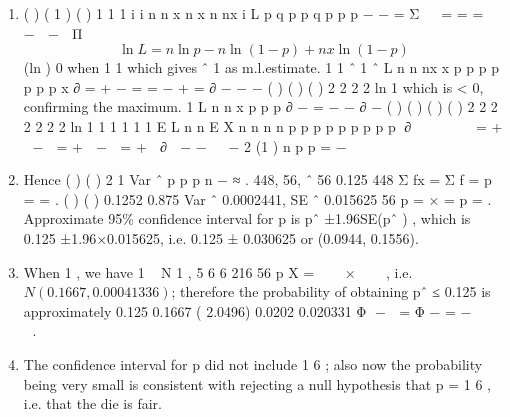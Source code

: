 \documentclass[a4paper,12pt]{article}
\begin{document}
\begin{enumerate}
\item ( ) ( 1 ) ( )
1
1
1
i i
n n
x n x n nx
i
L p q p p q p p
p
− −
=
Σ   = = =   −  −  Π
\[ \ln L = n \ln p − n\ln (1− p) + nx \ln(1− p)\]
(ln ) 0 when 1 1 which gives ˆ 1 as m.l.estimate.
1 1 ˆ 1 ˆ
L n n nx x p
p p p p p p x
∂ = + − = = − + =
∂ − − −
( ) ( )
( )
2
2 2 2
ln 1
which is < 0, confirming the maximum.
1
L n n x
p p p
∂ −
= − −
∂ −
( ) ( ) ( ) ( )
2
2 2 2 2 2 2
ln 1 1 1
1 1 1
E L n n E X n n n n
p p p p p p p p p
∂        = +  −  = +  −  = +  ∂  − −   −
2 (1 )
n
p p
=
−
\item Hence ( ) ( ) 2 1
Var ˆ
p p
p
n
−
≈ .
448, 56, ˆ 56 0.125
448
Σ fx = Σ f = p = = .
( ) ( )
0.1252 0.875 Var ˆ 0.0002441, SE ˆ 0.015625
56
p = × = p = .
Approximate 95\% confidence interval for p is pˆ ±1.96SE(pˆ ) , which is
0.125 ±1.96×0.015625, i.e. 0.125 ± 0.030625 or (0.0944, 0.1556).
\item When 1 , we have 1 ~ N 1 , 5
6 6 216 56
p
X
=    ×   
, i.e. $N(0.1667, 0.00041336)$; therefore
the probability of obtaining pˆ ≤ 0.125 is approximately
0.125 0.1667 ( 2.0496) 0.0202
0.020331
Φ −  = Φ − = −  
 
.
\item The confidence interval for p did not include 1
6
; also now the probability being very
small is consistent with rejecting a null hypothesis that p = 1
6
, i.e. that the die is fair.
\end{enumerate}
\end{document}
